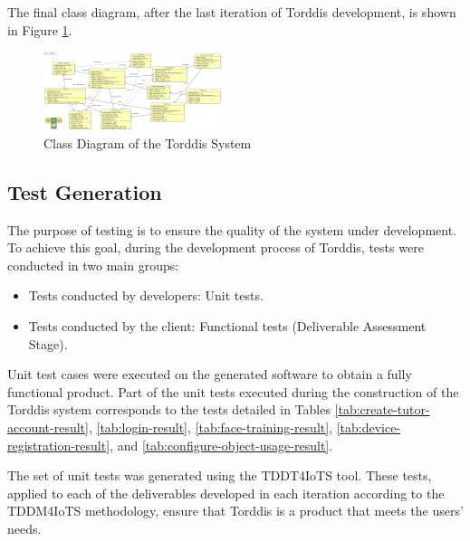 \documentclass[a4paper,fleqn]{cas-sc}
\begin{document}
			The final class diagram, after the last iteration of Torddis development, is shown in Figure \ref{fig:ClassDiagram}.
			
			\begin{figure}[hbt!]
				\centering
				\includegraphics[frame,scale=0.5, width=\linewidth]{figs/Figure_7}
				\caption{Class Diagram of the Torddis System\label{fig:ClassDiagram}}
			\end{figure}
			
		\subsection{Test Generation}
			The purpose of testing is to ensure the quality of the system under development. To achieve this goal, during the development process of Torddis, tests were conducted in two main groups:
			
			\begin{itemize}
				\item Tests conducted by developers: Unit tests.
				\item Tests conducted by the client: Functional tests (Deliverable Assessment Stage).
			\end{itemize}
			
			Unit test cases were executed on the generated software to obtain a fully functional product. Part of the unit tests executed during the construction of the Torddis system corresponds to the tests detailed in Tables
			\ref{tab:create-tutor-account-result}, \ref{tab:login-result}, \ref{tab:face-training-result}, \ref{tab:device-registration-result}, and \ref{tab:configure-object-usage-result}.
			
			The set of unit tests was generated using the TDDT4IoTS tool. These tests, applied to each of the deliverables developed in each iteration according to the TDDM4IoTS methodology, ensure that Torddis is a product that meets the users' needs.
			
\end{document}
